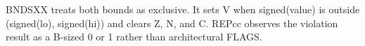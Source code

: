 BNDSXX treats both bounds as exclusive. It sets V when signed(value) is outside (signed(lo), signed(hi)) and clears Z, N, and C. REPcc observes the violation result as a B-sized 0 or 1 rather than architectural FLAGS.

